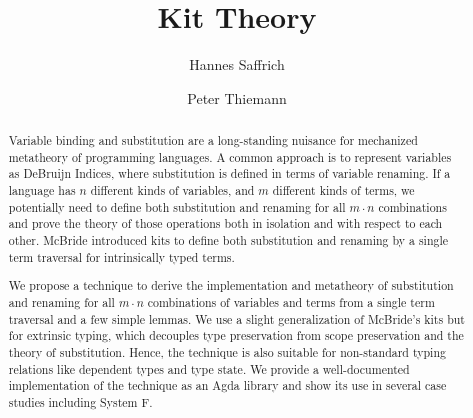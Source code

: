 \documentclass[sigplan, screen]{acmart}
\title{Kit Theory}
\author{Hannes Saffrich}
\affiliation{
  \institution{University of Freiburg}      %
  \country{Germany}                         %
}
\author{Peter Thiemann}
\affiliation{
  \institution{University of Freiburg}      %
  \country{Germany}                         %
}
\begin{document}
  \begin{abstract}
    Variable binding and substitution are a long-standing nuisance for mechanized
    metatheory of programming languages. A common approach is to represent
    variables as DeBruijn Indices, where substitution is defined in terms of
    variable renaming. If a language has $n$ different kinds of variables, and
    $m$ different kinds of terms, we potentially need to define both
    substitution and renaming for all $m\cdot n$ combinations and prove the
    theory of those operations both in isolation and with respect to each other.
    McBride introduced kits to define both substitution and renaming by a
    single term traversal for intrinsically typed terms.\cite{mcbride2005kits}

    We propose a technique to derive the implementation and metatheory of
    substitution and renaming for all $m\cdot n$ combinations of variables and terms
    from a single term traversal and a few simple lemmas.
    We use a slight generalization of McBride's kits but for extrinsic typing,
    which decouples type preservation from scope preservation and the
    theory of substitution. Hence, the technique is also suitable for
    non-standard typing relations like dependent types and type state.
    We provide a well-documented implementation of the technique as an Agda
    library and show its use in several case studies including System F.
  \end{abstract}

  \maketitle



  

  \clearpage
  \appendix
\end{document}
